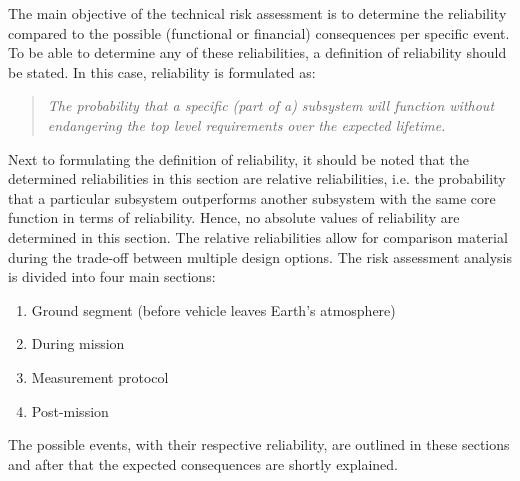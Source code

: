 The main objective of the technical risk assessment is to determine the reliability compared to the possible (functional or financial) consequences per specific event. To be able to determine any of these reliabilities, a definition of reliability should be stated. In this case, reliability is formulated as:
\begin{quote}
\emph{The probability that a specific (part of a) subsystem will function without endangering the top level requirements over the expected lifetime.}
\end{quote}


Next to formulating the definition of reliability, it should be noted that the determined reliabilities in this section are relative reliabilities, i.e. the probability that a particular subsystem outperforms another subsystem with the same core function in terms of reliability. Hence, no absolute values of reliability are determined in this section. The relative reliabilities allow for comparison material during the trade-off between multiple design options. 
The risk assessment analysis is divided into four main sections: 
\begin{enumerate}[I]
	\item Ground segment (before vehicle leaves Earth's atmosphere)
	\item During mission
	\item Measurement protocol
	\item Post-mission
\end{enumerate}
The possible events, with their respective reliability, are outlined in these sections and after that the expected consequences are shortly explained. 

